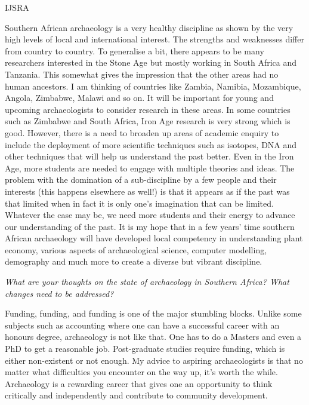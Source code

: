 \documentclass[%
	]{ijsra}
\begin{document}
\begin{labeling}{IJSRA}
\item[SC] Southern African archaeology is a very healthy discipline as shown by the very high levels of local and international interest. The strengths and weaknesses differ from country to country. To generalise a bit, there appears to be many researchers interested in the Stone Age but mostly working in South Africa and Tanzania. This somewhat gives the impression that the other areas had no human ancestors. I am thinking of countries like Zambia, Namibia, Mozambique, Angola, Zimbabwe, Malawi and so on. It will be important for young and upcoming archaeologists to consider research in these areas. In some countries such as Zimbabwe and South Africa, Iron Age research is very strong which is good. However, there is a need to broaden up areas of academic enquiry to include the deployment of more scientific techniques such as isotopes, DNA and other techniques that will help us understand the past better. Even in the Iron Age, more students are needed to engage with multiple theories and ideas. The problem with the domination of a sub-discipline by a few people and their interests (this happens elsewhere as well!) is that it appears as if the past was that limited when in fact it is only one’s imagination that can be limited. Whatever the case may be, we need more students and their energy to advance our understanding of the past. It is my hope that in a few years’ time southern African archaeology will have developed local competency in understanding plant economy, various aspects of archaeological science, computer modelling, demography and much more to create a diverse but vibrant discipline.


\item[IJSRA] \emph{What are your thoughts on the state of archaeology in Southern Africa? What changes need to be addressed?}
	
\item[SC] Funding, funding, and funding is one of the major stumbling blocks. Unlike some subjects such as accounting where one can have a successful career with an honours degree, archaeology is not like that. One has to do a Masters and even a PhD to get a reasonable job. Post-graduate studies require funding, which is either non-existent or not enough. My advice to aspiring archaeologists is that no matter what difficulties you encounter on the way up, it’s worth the while. Archaeology is a rewarding career that gives one an opportunity to think critically and independently and contribute to community development.



\end{labeling}
\end{document}
